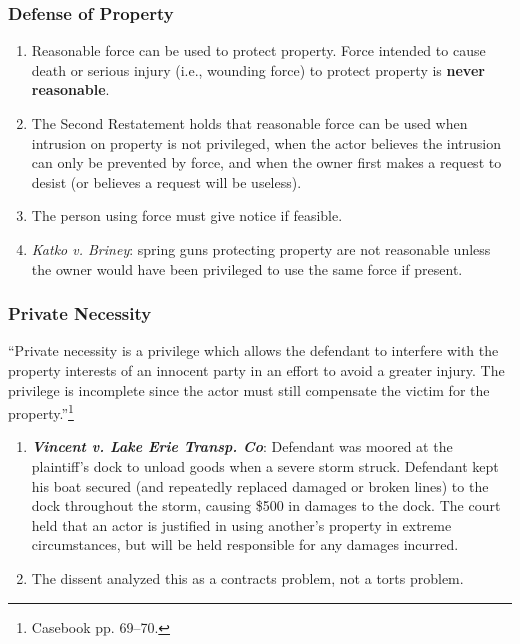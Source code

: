 
\subsubsection{Defense of Property}

\begin{enumerate}
    \item Reasonable force can be used to protect property. Force intended to cause death or serious injury (i.e., wounding force) to protect property is \textbf{never reasonable}. %
    \item The Second Restatement holds that reasonable force can be used when intrusion on property is not privileged, when the actor believes the intrusion can only be prevented by force, and when the owner first makes a request to desist (or believes a request will be useless).
    \item The person using force must give notice if feasible.
    \item \emph{Katko v. Briney}: spring guns protecting property are not reasonable unless the owner would have been privileged to use the same force if present.
\end{enumerate}

\subsubsection{Private Necessity}



``Private necessity is a privilege which allows the defendant to interfere with the property interests of an innocent party in an effort to avoid a greater injury. The privilege is incomplete since the actor must still compensate the victim for the property.''\footnote{Casebook pp. 69--70.}

\begin{enumerate}
    \item \textbf{\emph{Vincent v. Lake Erie Transp. Co}}: Defendant was moored at the plaintiff's dock to unload goods when a severe storm struck. Defendant kept his boat secured (and repeatedly replaced damaged or broken lines) to the dock throughout the storm, causing \$500 in damages to the dock. The court held that an actor is justified in using another's property in extreme circumstances, but will be held responsible for any damages incurred.
    \item The dissent analyzed this as a contracts problem, not a torts problem.
\end{enumerate}

